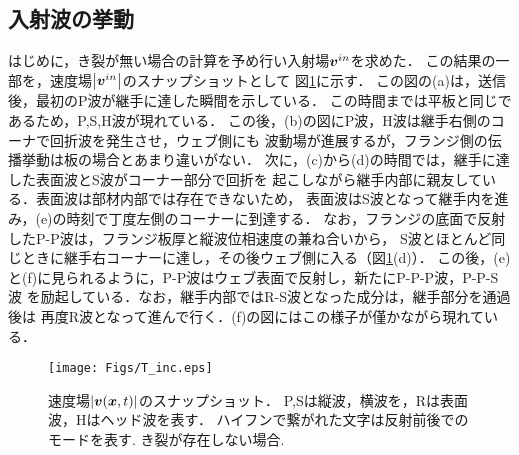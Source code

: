 \subsection{入射波の挙動}
はじめに，き裂が無い場合の計算を予め行い入射場$\mbox{\boldmath $v$}^{in}$を求めた．
この結果の一部を，速度場$\left| \mbox{\boldmath $v$}^{in}\right|$のスナップショットとして
図\ref{fig:fig3_5}に示す．
この図の(a)は，送信後，最初のP波が継手に達した瞬間を示している．
この時間までは平板と同じであるため，P,S,H波が現れている．
この後，(b)の図にP波，H波は継手右側のコーナで回折波を発生させ，ウェブ側にも
波動場が進展するが，フランジ側の伝播挙動は板の場合とあまり違いがない．
次に，(c)から(d)の時間では，継手に達した表面波とS波がコーナー部分で回折を
起こしながら継手内部に親友している．表面波は部材内部では存在できないため，
表面波はS波となって継手内を進み，(e)の時刻で丁度左側のコーナーに到達する．
なお，フランジの底面で反射したP-P波は，フランジ板厚と縦波位相速度の兼ね合いから，
S波とほとんど同じときに継手右コーナーに達し，その後ウェブ側に入る（図\ref{fig:fig3_5}(d)）．
この後，(e)と(f)に見られるように，P-P波はウェブ表面で反射し，新たにP-P-P波，P-P-S波
を励起している．なお，継手内部ではR-S波となった成分は，継手部分を通過後は
再度R波となって進んで行く．(f)の図にはこの様子が僅かながら現れている．
\begin{figure}[h]
	\begin{center}
	\texttt{[image: Figs/T\_inc.eps]} 
	\end{center}
	\caption{
		速度場$|\mbox{\boldmath $v$}(\mbox{\boldmath $x$},t)|$のスナップショット．
		P,Sは縦波，横波を，Rは表面波，Hはヘッド波を表す．
		ハイフンで繋がれた文字は反射前後でのモードを表す. き裂が存在しない場合.
	} 
	\label{fig:fig3_5}
\end{figure}
